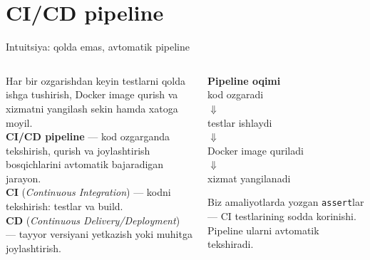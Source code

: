 \documentclass[aspectratio=169,11pt]{beamer}
\newcommand{\uzq}{\textquotesingle{}}   %
\begin{document}
\section[CI/CD]{CI/CD pipeline}

\begin{frame}{Intuitsiya: qo\uzq{}lda emas, avtomatik pipeline}
  \small

  \begin{columns}[T,totalwidth=\textwidth]
    \begin{column}{0.52\textwidth}
      Har bir o\uzq{}zgarishdan keyin testlarni qo\uzq{}lda ishga tushirish,
      Docker image qurish va xizmatni yangilash sekin hamda xatoga moyil.\\[5pt]

      \textbf{CI/CD pipeline} --- kod o\uzq{}zgarganda tekshirish, qurish va
      joylashtirish bosqichlarini avtomatik bajaradigan jarayon.\\[6pt]

      \textbf{CI} (\textit{Continuous Integration}) ---
      kodni tekshirish: testlar va build.\\[3pt]

      \textbf{CD} (\textit{Continuous Delivery/Deployment}) ---
      tayyor versiyani yetkazish yoki muhitga joylashtirish.
    \end{column}

    \begin{column}{0.45\textwidth}
      \begin{tcolorbox}[defbox,top=2pt,bottom=2pt,left=4pt,right=4pt]
        \centering
        \footnotesize
        \textbf{Pipeline oqimi}\\[4pt]
        kod o\uzq{}zgaradi\\[-1pt]
        $\Downarrow$\\[-1pt]
        testlar ishlaydi\\[-1pt]
        $\Downarrow$\\[-1pt]
        Docker image quriladi\\[-1pt]
        $\Downarrow$\\[-1pt]
        xizmat yangilanadi
      \end{tcolorbox}

      \vspace{4pt}

      \begin{tcolorbox}[okbox,top=2pt,bottom=2pt,left=4pt,right=4pt]
        \footnotesize
        Biz amaliyotlarda yozgan \texttt{assert}lar --- CI testlarining
        sodda ko\uzq{}rinishi. Pipeline ularni avtomatik tekshiradi.
      \end{tcolorbox}
    \end{column}
  \end{columns}
\end{frame}
\end{document}
